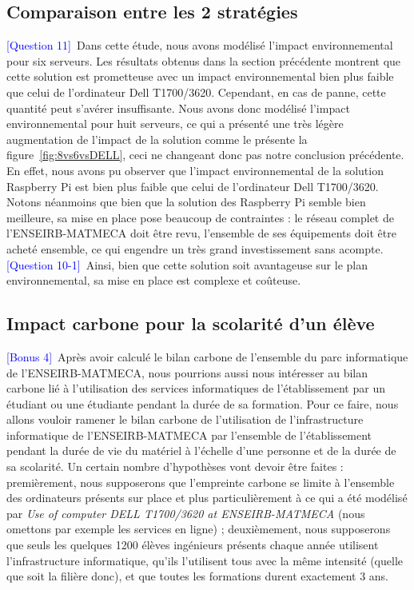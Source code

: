 \documentclass[12pt,a4paper]{paper}
\begin{document}
\subsection{Comparaison entre les 2 stratégies}
\textcolor{blue}{[Question 11]}~Dans cette étude, nous avons modélisé l'impact environnemental pour six serveurs. Les résultats obtenus dans la section précédente montrent que cette solution est prometteuse avec un impact environnemental bien plus faible que celui de l'ordinateur Dell T1700/3620. Cependant, en cas de panne, cette quantité peut s'avérer insuffisante. Nous avons donc modélisé l'impact environnemental pour huit serveurs, ce qui a présenté une très légère augmentation de l'impact de la solution comme le présente la figure~\ref{fig:8vs6vsDELL}, ceci ne changeant donc pas notre conclusion précédente. En effet, nous avons pu observer que l'impact environnemental de la solution Raspberry Pi est bien plus faible que celui de l'ordinateur Dell T1700/3620.\\
Notons néanmoins que bien que la solution des Raspberry Pi semble bien meilleure, sa mise en place pose beaucoup de contraintes : le réseau complet de l'ENSEIRB-MATMECA doit être revu, l'ensemble de ses équipements doit être acheté ensemble, ce qui engendre un très grand investissement sans acompte. \\
\textcolor{blue}{[Question 10-1]}~Ainsi, bien que cette solution soit avantageuse sur le plan environnemental, sa mise en place est complexe et coûteuse.\\

\subsection{Impact carbone pour la scolarité d'un élève}
\textcolor{blue}{[Bonus 4]}~Après avoir calculé le bilan carbone de l'ensemble du parc informatique de l'ENSEIRB-MATMECA, nous pourrions aussi nous intéresser au bilan carbone lié à l'utilisation des services informatiques de l'établissement par un étudiant ou une étudiante pendant la durée de sa formation. Pour ce faire, nous allons vouloir ramener le bilan carbone de l'utilisation de l'infrastructure informatique de l'ENSEIRB-MATMECA par l'ensemble de l'établissement pendant la durée de vie du matériel à l'échelle d'une personne et de la durée de sa scolarité. Un certain nombre d'hypothèses vont devoir être faites : premièrement, nous supposerons que l'empreinte carbone se limite à l'ensemble des ordinateurs présents sur place et plus particulièrement à ce qui a été modélisé par \textit{Use of computer DELL T1700/3620 at ENSEIRB-MATMECA} (nous omettons par exemple les services en ligne) ; deuxièmement, nous supposerons que seuls les quelques 1200 élèves ingénieurs présents chaque année utilisent l'infrastructure informatique, qu'ils l'utilisent tous avec la même intensité (quelle que soit la filière donc), et que toutes les formations durent exactement 3 ans.
\end{document}
